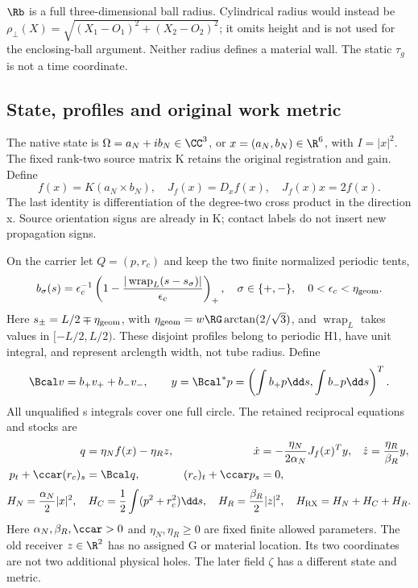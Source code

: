 $\Rb$ is a full three-dimensional ball radius. Cylindrical radius would instead be $\rho_\perp(X)=\sqrt{(X_1-O_1)^2+(X_2-O_2)^2}$; it omits height and is not used for the enclosing-ball argument. Neither radius defines a material wall. The static $\tau_g$ is not a time coordinate.

\subsection{State, profiles and original work metric}
The native state is $\Omega=a_N+ib_N\in\CC^3$, or $x=(a_N,b_N)\in\R^6$, with $I=|x|^2$. The fixed rank-two source matrix K retains the original registration and gain. Define
\begin{equation}\label{eq:drive}
f(x)=K(a_N\times b_N),\quad J_f(x)=D_xf(x),\quad J_f(x)x=2f(x).
\end{equation}
The last identity is differentiation of the degree-two cross product in the direction x. Source orientation signs are already in K; contact labels do not insert new propagation signs.

On the carrier let $Q=(p,r_c)$ and keep the two finite normalized periodic tents,
\begin{equation}\label{eq:profiles}
b_\sigma(s)=\epsilon_c^{-1}\left(1-\frac{|\operatorname{wrap}_L(s-s_\sigma)|}{\epsilon_c}\right)_+,
\quad \sigma\in\{+,-\},\quad 0<\epsilon_c<\eta_{\rm geom}.
\end{equation}
Here $s_\pm=L/2\mp\eta_{\rm geom}$, with
$\eta_{\rm geom}=w\RG\arctan(2/\sqrt3)$, and $\operatorname{wrap}_L$ takes values in $[-L/2,L/2)$. These disjoint profiles belong to periodic H1, have unit integral, and represent arclength width, not tube radius. Define
\begin{equation}\label{eq:ports}
\Bcal v=b_+v_++b_-v_-,\qquad
y=\Bcal^*p=\left(\int b_+p\dd s,\int b_-p\dd s\right)^T.
\end{equation}
All unqualified s integrals cover one full circle. The retained reciprocal equations and stocks are~\cite{RXcandidate,RXpower}
\begin{equation}\label{eq:RX}
\begin{aligned}
q&=\eta_N f(x)-\eta_Rz,&
\dot x&=-\frac{\eta_N}{2\alpha_N}J_f(x)^Ty,&
\dot z&=\frac{\eta_R}{\beta_R}y,\\
p_t+\ccar(r_c)_s&=\Bcal q,&(r_c)_t+\ccar p_s&=0,
\end{aligned}
\end{equation}
\begin{equation}\label{eq:RXstocks}
H_N=\frac{\alpha_N}{2}|x|^2,\quad
H_C=\frac12\int(p^2+r_c^2)\dd s,\quad
H_R=\frac{\beta_R}{2}|z|^2,\quad H_{\rm RX}=H_N+H_C+H_R.
\end{equation}
Here $\alpha_N,\beta_R,\ccar>0$ and $\eta_N,\eta_R\ge0$ are fixed finite allowed parameters. The old receiver $z\in\R^2$ has no assigned G or material location. Its two coordinates are not two additional physical holes. The later field $\zeta$ has a different state and metric.

